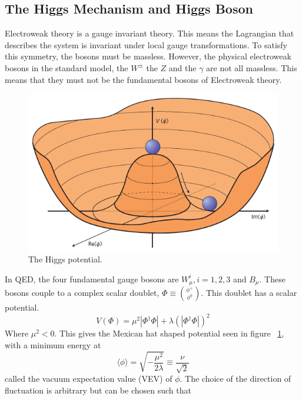 \subsection{The Higgs Mechanism and Higgs Boson}
\label{ssec:Higgs}
Electroweak theory is a gauge invariant theory. This means the Lagrangian that describes the system is invariant under local gauge transformations. To satisfy this symmetry, the bosons must be massless. However, the physical electroweak bosons in the standard model, the ${W^{\pm}}$ the ${Z}$ and the ${\gamma}$ are not all massless. This means that they must not be the fundamental bosons of Electroweak theory.\newline

\begin{figure}[h]
\begin{center}
\includegraphics[scale=0.65]{figures/higgspotential}
\caption[The Higgs potential]{The Higgs potential.\cite{Ellis:1638469}}
\label{Fig:higgspot}
\end{center}
\end{figure}

\indent In QED, the four fundamental gauge bosons are ${W^{i}_{\mu}, i = 1,2,3}$ and ${B_{\mu}}$. These bosons couple to a complex scalar doublet, ${\Phi \equiv \binom{\phi^{+}}{\phi^{0}}}$. This doublet has a scalar potential.
\begin{equation}
\label{eq:higgsPot}
V(\Phi) = \mu^{2}|\Phi^{\dagger}\Phi| + \lambda(|\Phi^{\dagger}\Phi|)^{2}
\end{equation}
Where ${\mu^{2} < 0}$. This gives the Mexican hat shaped potential seen in figure ~\ref{Fig:higgspot}, with a minimum energy at 
\begin{equation}
\langle \phi \rangle = \sqrt{-\frac{\mu^{2}}{2\lambda}}\equiv \frac{\nu}{\sqrt{2}}
\end{equation}
called the vacuum expectation value (VEV) of ${\phi}$. The choice of the direction of fluctuation is arbitrary but can be chosen such that


